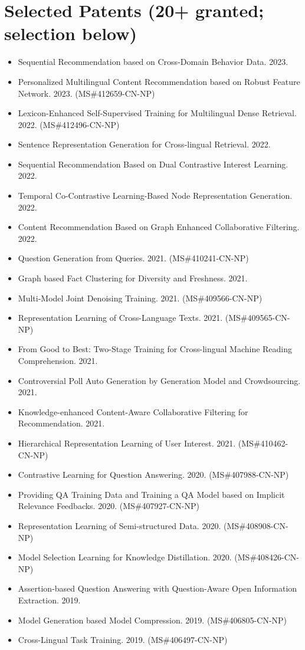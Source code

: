 \documentclass[10.5pt,letterpaper]{article}
\begin{document}
\section*{Selected Patents (20+ granted; selection below)}
\begin{itemize}[leftmargin=1.1em, itemsep=0pt, topsep=1pt, parsep=0pt]
  \item Sequential Recommendation based on Cross-Domain Behavior Data. 2023.
  \item Personalized Multilingual Content Recommendation based on Robust Feature Network. 2023. (MS\#412659-CN-NP)
  \item Lexicon-Enhanced Self-Supervised Training for Multilingual Dense Retrieval. 2022. (MS\#412496-CN-NP)
  \item Sentence Representation Generation for Cross-lingual Retrieval. 2022.
  \item Sequential Recommendation Based on Dual Contrastive Interest Learning. 2022.
  \item Temporal Co-Contrastive Learning-Based Node Representation Generation. 2022.
  \item Content Recommendation Based on Graph Enhanced Collaborative Filtering. 2022.
  \item Question Generation from Queries. 2021. (MS\#410241-CN-NP)
  \item Graph based Fact Clustering for Diversity and Freshness. 2021.
  \item Multi-Model Joint Denoising Training. 2021. (MS\#409566-CN-NP)
  \item Representation Learning of Cross-Language Texts. 2021. (MS\#409565-CN-NP)
  \item From Good to Best: Two-Stage Training for Cross-lingual Machine Reading Comprehension. 2021.
  \item Controversial Poll Auto Generation by Generation Model and Crowdsourcing. 2021.
  \item Knowledge-enhanced Content-Aware Collaborative Filtering for Recommendation. 2021.
  \item Hierarchical Representation Learning of User Interest. 2021. (MS\#410462-CN-NP)
  \item Contrastive Learning for Question Answering. 2020. (MS\#407988-CN-NP)
  \item Providing QA Training Data and Training a QA Model based on Implicit Relevance Feedbacks. 2020. (MS\#407927-CN-NP)
  \item Representation Learning of Semi-structured Data. 2020. (MS\#408908-CN-NP)
  \item Model Selection Learning for Knowledge Distillation. 2020. (MS\#408426-CN-NP)
  \item Assertion-based Question Answering with Question-Aware Open Information Extraction. 2019.
  \item Model Generation based Model Compression. 2019. (MS\#406805-CN-NP)
  \item Cross-Lingual Task Training. 2019. (MS\#406497-CN-NP)
\end{itemize}
\end{document}

